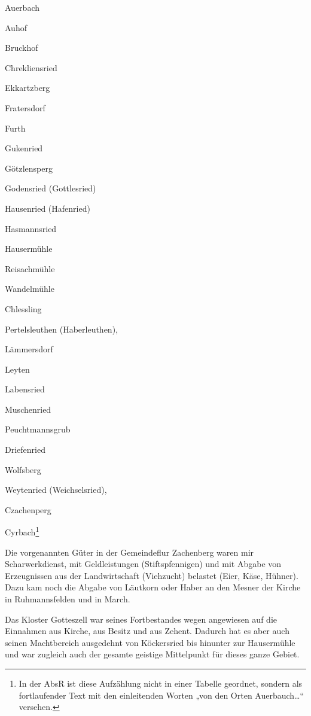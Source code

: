 \documentclass[12pt,a4pager,draft]{book}
\begin{document}
\begin{compactitem}
\item Auerbach
\item Auhof
\item Bruckhof
\item Chrekliensried
\item Ekkartzberg
\item Fratersdorf
\item Furth
\item Gukenried
\item Götzlensperg
\item Godensried (Gottlesried)
\item Hausenried (Hafenried)
\item Hasmannsried
\item Hausermühle
\item Reisachmühle
\item Wandelmühle
\item Chlessling
\item Pertelsleuthen (Haberleuthen),
\item Lämmersdorf
\item Leyten
\item Labensried
\item Muschenried
\item Peuchtmannsgrub
\item Driefenried
\item Wolfsberg
\item Weytenried (Weichselsried),
\item Czachenperg
\item Cyrbach\footnote{In der AbsR ist diese Aufzählung nicht in einer Tabelle
geordnet, sondern als fortlaufender Text mit den einleitenden Worten „von den
Orten Auerbauch…“ versehen.}
\end{compactitem}

Die vorgenannten Güter in der Gemeindeflur Zachenberg waren mir Scharwerkdienst,
mit Geldleistungen (Stiftspfennigen) und mit Abgabe von Erzeugnissen aus der
Landwirtschaft (Viehzucht) belastet (Eier, Käse, Hühner). Dazu kam noch die
Abgabe von Läutkorn oder Haber an den Mesner der Kirche in Ruhmannsfelden und in
March.

Das Kloster Gotteszell war seines Fortbestandes wegen angewiesen auf die
Einnahmen aus Kirche, aus Besitz und aus Zehent. Dadurch hat es aber auch seinen
Machtbereich ausgedehnt von Köckersried bis hinunter zur Hausermühle und war
zugleich auch der gesamte geistige Mittelpunkt für dieses ganze Gebiet.
\end{document}
